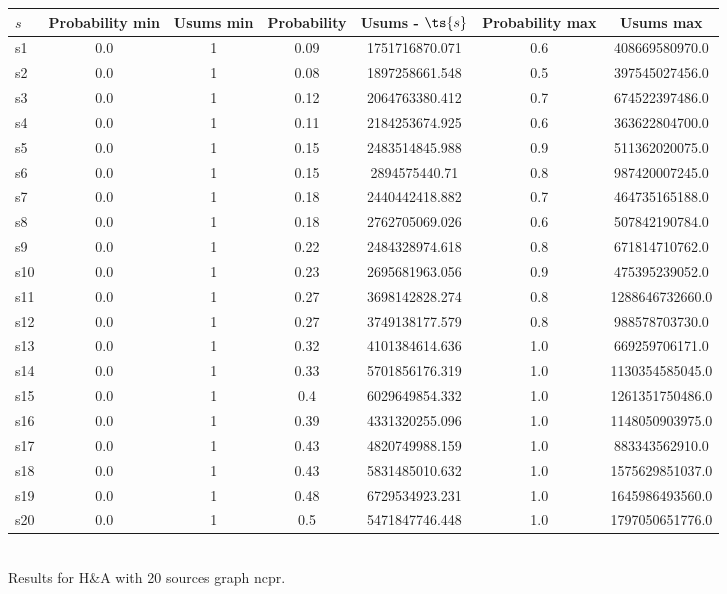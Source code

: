 \documentclass{article}
\begin{document}
\noindent\begin{tabular}{|l|c|c|c|c|c|c|}
\hline
$s$& Probability min & Usums min & Probability & Usums - $\ts{s}$ & Probability max & Usums max\\
\hline
s1 &0.0 & 1 & 0.09 & 1751716870.071 & 0.6 & 408669580970.0\\
\hline
s2 &0.0 & 1 & 0.08 & 1897258661.548 & 0.5 & 397545027456.0\\
\hline
s3 &0.0 & 1 & 0.12 & 2064763380.412 & 0.7 & 674522397486.0\\
\hline
s4 &0.0 & 1 & 0.11 & 2184253674.925 & 0.6 & 363622804700.0\\
\hline
s5 &0.0 & 1 & 0.15 & 2483514845.988 & 0.9 & 511362020075.0\\
\hline
s6 &0.0 & 1 & 0.15 & 2894575440.71 & 0.8 & 987420007245.0\\
\hline
s7 &0.0 & 1 & 0.18 & 2440442418.882 & 0.7 & 464735165188.0\\
\hline
s8 &0.0 & 1 & 0.18 & 2762705069.026 & 0.6 & 507842190784.0\\
\hline
s9 &0.0 & 1 & 0.22 & 2484328974.618 & 0.8 & 671814710762.0\\
\hline
s10 &0.0 & 1 & 0.23 & 2695681963.056 & 0.9 & 475395239052.0\\
\hline
s11 &0.0 & 1 & 0.27 & 3698142828.274 & 0.8 & 1288646732660.0\\
\hline
s12 &0.0 & 1 & 0.27 & 3749138177.579 & 0.8 & 988578703730.0\\
\hline
s13 &0.0 & 1 & 0.32 & 4101384614.636 & 1.0 & 669259706171.0\\
\hline
s14 &0.0 & 1 & 0.33 & 5701856176.319 & 1.0 & 1130354585045.0\\
\hline
s15 &0.0 & 1 & 0.4 & 6029649854.332 & 1.0 & 1261351750486.0\\
\hline
s16 &0.0 & 1 & 0.39 & 4331320255.096 & 1.0 & 1148050903975.0\\
\hline
s17 &0.0 & 1 & 0.43 & 4820749988.159 & 1.0 & 883343562910.0\\
\hline
s18 &0.0 & 1 & 0.43 & 5831485010.632 & 1.0 & 1575629851037.0\\
\hline
s19 &0.0 & 1 & 0.48 & 6729534923.231 & 1.0 & 1645986493560.0\\
\hline
s20 &0.0 & 1 & 0.5 & 5471847746.448 & 1.0 & 1797050651776.0\\
\hline
\end{tabular}\\

\noindent Results for H\&A with 20 sources graph ncpr.
\end{document}
